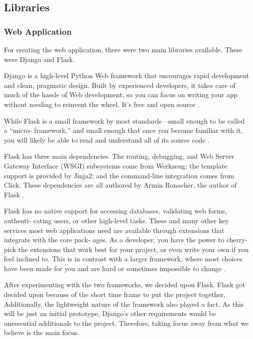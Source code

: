 	\subsection{Libraries}
	\subsubsection{Web Application}
	For creating the web application, there were two main libraries available. These were Django and Flask.
	
	Django is a high-level Python Web framework that encourages rapid development and clean, pragmatic design. Built by experienced developers, it takes care of much of the hassle of Web development, so you can focus on writing your app without needing to reinvent the wheel. It’s free and open source \cite{django}.
	
	While Flask is a small framework by most standards—small enough to be called a “micro- framework,” and small enough that once you become familiar with it, you will likely be able to read and understand all of its source code \cite{grinberg2018flask}. 
	
	Flask has three main dependencies. The routing, debugging, and Web Server Gateway Interface (WSGI) subsystems come from Werkzeug; the template support is provided by Jinja2; and the command-line integration comes from Click. These dependencies are all authored by Armin Ronacher, the author of Flask \cite{grinberg2018flask}. 
	
	Flask has no native support for accessing databases, validating web forms, authenti‐ cating users, or other high-level tasks. These and many other key services most web applications need are available through extensions that integrate with the core pack‐ ages. As a developer, you have the power to cherry-pick the extensions that work best for your project, or even write your own if you feel inclined to. This is in contrast with a larger framework, where most choices have been made for you and are hard or sometimes impossible to change \cite{grinberg2018flask}.
	
	After experimenting with the two frameworks, we decided upon Flask. Flask got decided upon because of the short time frame to put the project together. Additionally, the lightweight nature of the framework also played a fact. As this will be just an initial prototype, Django's other requirements would be unessential additionals to the project. Therefore, taking focus away from what we believe is the main focus. 
	
